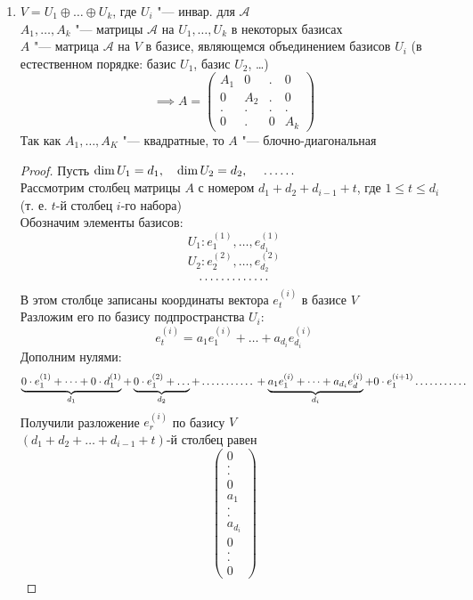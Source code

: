 \begin{theorem}
\begin{enumerate}
\begin{proof}
$$\begin{pmatrix}
			\end{pmatrix} $$
		\end{proof}
		\item $ V = U_1 \oplus \dots \oplus U_k $, где $ U_i $ "--- инвар. для $ \mathcal{A} $ \\
		$ A_1, \dots, A_k $ "--- матрицы $ \mathcal{A} $ на $ U_1, \dots, U_k $ в некоторых базисах \\
		$ A $ "--- матрица $ \mathcal{A} $ на $ V $ в базисе, являющемся объединением базисов $ U_i $ (в естественном порядке: базис $ U_1 $, базис $ U_2 $, \dots)
		$$ \implies A =
		\begin{pmatrix}
			A_1 & 0 & . & 0 \\
			0 & A_2 & . & 0 \\
			. & . & . & . \\
			0 & . & 0 & A_k
		\end{pmatrix} $$
		Так как $ A_1, \dots, A_K $ "--- квадратные, то $ A $ "--- блочно-диагональная
		\begin{proof}
			Пусть $ \dim U_1 = d_1, \quad \dim U_2 = d_2, \quad \widedots[3em] $ \\
			Рассмотрим столбец матрицы $ A $ с номером $ d_1 + d_2 + d_{i - 1} + t $, где $ 1 \le t \le d_i $ (т. е. $ t $-й столбец $ i $-го набора) \\
			Обозначим элементы базисов:
			$$ U_1 : e_1^{(1)}, \dots, e_{d_1}^{(1)} $$
			$$ U_2 : e_2^{(2)}, \dots, e_{d_2}^{(2)} $$
			$$ \widedots[6em] $$
			В этом столбце записаны координаты вектора $ e_t^{(i)} $ в базисе $ V $ \\
			Разложим его по базису подпространства $ U_i $:
			$$ e_t^{(i)} = a_1e_1^{(i)} + \dots + a_{d_i}e_{d_i}^{(i)} $$
			Дополним нулями:
			$$ \underbrace{0 \cdot e_1^{(1)} + \dots + 0 \cdot d_1^{(1)}}_{d_1} + \underbrace{0 \cdot e_1^{(2)} + \dots}_{d_2} + \widedots[5em] + \underbrace{a_1e_1^{(i)} + \dots + a_{d_i}e_d^{(i)}}_{d_i} + 0 \cdot e_1^{(i + 1)} \widedots[5em] $$
			Получили разложение $ e_r^{(i)} $ по базису $ V $ \\
			$ (d_1 + d_2 + \dots + d_{i - 1} + t) $-й столбец равен
			$$
			\begin{pmatrix}
				0 \\
				. \\
				. \\
				0 \\
				a_1 \\
				. \\
				. \\
				a_{d_i} \\
				0 \\
				. \\
				. \\
				0
			\end{pmatrix} $$
		\end{proof}
	\end{enumerate}
\end{theorem}


